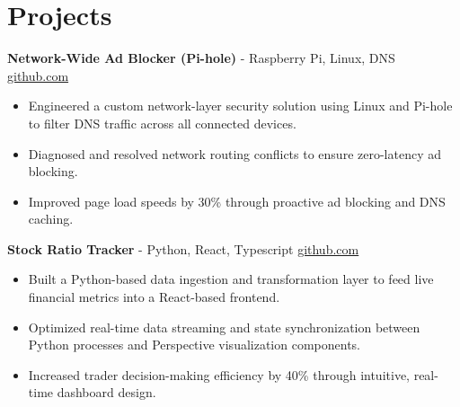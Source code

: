 \documentclass[11pt]{article}       %
\begin{document}

\vspace{-18.5pt}

\section*{Projects}

\textbf{Network-Wide Ad Blocker (Pi-hole)}{ - Raspberry Pi, Linux, DNS} \hfill \href{https://github.com/Monica20030707}{github.com} \\
\vspace{-9pt}
\begin{itemize}
  \item Engineered a custom network-layer security solution using Linux and Pi-hole to filter DNS traffic across all connected devices.
  \item Diagnosed and resolved network routing conflicts to ensure zero-latency ad blocking.
  \item Improved page load speeds by 30\% through proactive ad blocking and DNS caching.
\end{itemize}

\textbf{Stock Ratio Tracker}{ - Python, React, Typescript} \hfill \href{https://github.com/Monica20030707/tradingDashboard-UI}{github.com} \\
\vspace{-9pt}
\begin{itemize}
  \item Built a Python-based data ingestion and transformation layer to feed live financial metrics into a React-based frontend.
  \item Optimized real-time data streaming and state synchronization between Python processes and Perspective visualization components.
  \item Increased trader decision-making efficiency by 40\% through intuitive, real-time dashboard design.
\end{itemize}
\end{document}
